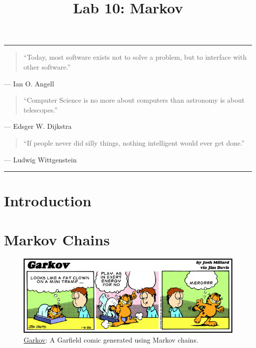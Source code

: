 \documentclass[11pt]{cselabheader}
\title{Lab 10: Markov}
\begin{document}
\maketitle

\hrule
\begin{quotation}
``Today, most software exists not to solve a problem, but to interface with other
software.''
\end{quotation}
\begin{flushright}
--- Ian O. Angell
\end{flushright}

\begin{quotation}
``Computer Science is no more about computers than astronomy is about
telescopes.''
\end{quotation}
\begin{flushright}
--- Edsger W. Dijkstra
\end{flushright}

\begin{quotation}
``If people never did silly things, nothing intelligent would ever get done.''
\end{quotation}
\begin{flushright}
--- Ludwig Wittgenstein
\end{flushright}

\hrule

\section{Introduction}


\section{Markov Chains}
\label{sec:markov}

\begin{figure}
  \centering
  \includegraphics[width=\linewidth]{img/garkov}
  \caption{\href{http://joshmillard.com/garkov/}{Garkov}: A Garfield comic generated using Markov chains.}
  \label{garkov}
\end{figure}
\end{document}
